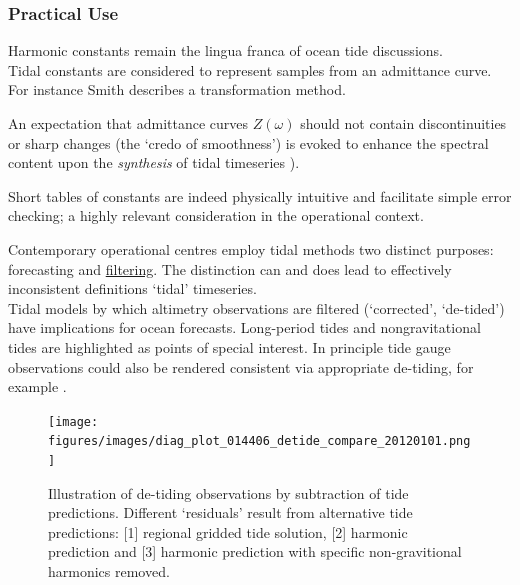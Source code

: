 \subsubsection{Practical Use}

Harmonic constants remain the lingua franca of ocean tide discussions.\\
Tidal constants are considered to represent samples from an admittance curve. For instance Smith\cite{Smith:1997ut} describes a transformation method.

An expectation that admittance curves $Z(\omega)$ should not contain discontinuities or sharp changes (the `credo of smoothness') is evoked to enhance the spectral content upon the \emph{synthesis} of tidal timeseries \citep[pp 268]{Fu:2001ub}).


Short tables of constants are indeed physically intuitive and facilitate simple error checking; a highly relevant consideration in the operational context.





Contemporary operational centres employ tidal methods two distinct purposes: forecasting and \underline{filtering}. The distinction can and does lead to effectively inconsistent definitions `tidal' timeseries.\\
Tidal models by which altimetry observations are filtered (`corrected', `de-tided') \citep[table 3.2]{Scharroo:2011vd} have implications for ocean forecasts. Long-period tides \citep{Egbert:2003jd} and nongravitational tides \citep{Arbic:2005gv} are highlighted as points of special interest. 
In principle tide gauge observations could also be rendered consistent via appropriate de-tiding, for example \cite{Matsumoto:2000tg}.\\


\begin{figure}[h]
\begin{center}
\texttt{[image: figures/images/diag\_plot\_014406\_detide\_compare\_20120101.png]}
\caption{Illustration of de-tiding observations by subtraction of tide predictions.  Different `residuals' result from alternative tide predictions: [1] regional gridded tide solution, [2] harmonic prediction and [3] harmonic prediction with specific non-gravitional harmonics removed. }
\end{center}
\end{figure}





